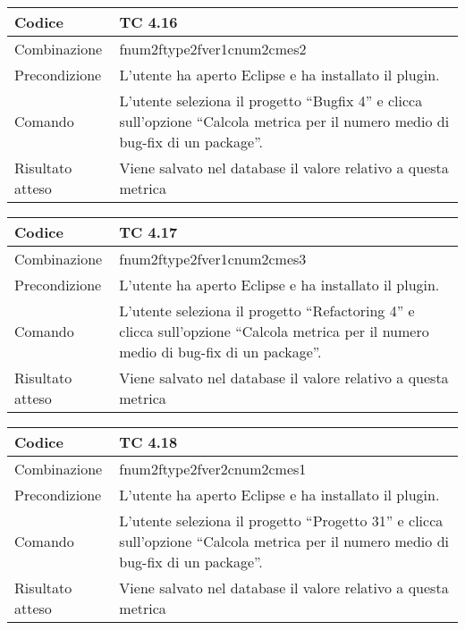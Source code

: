 \begin{table}[ht]
\begin{tabular}{|p{3cm}|p{9cm}|}
\hline
\cellcolor{lightgray}Codice				& TC 4.16								\\
\hline
\cellcolor{lightgray}Combinazione		& fnum2ftype2fver1cnum2cmes2								\\
\hline
\cellcolor{lightgray}Precondizione		& L'utente ha aperto Eclipse e ha installato il plugin.				\\
\hline
\cellcolor{lightgray}Comando			& L'utente seleziona il progetto ``Bugfix 4''  e clicca sull'opzione ``Calcola metrica per il numero medio di bug-fix di un package''.	\\
\hline
\cellcolor{lightgray}Risultato atteso	& Viene salvato nel database il valore relativo a questa metrica	\\
\hline
\end{tabular}
\end{table}

\begin{table}[ht]
\begin{tabular}{|p{3cm}|p{9cm}|}
\hline
\cellcolor{lightgray}Codice				& TC 4.17								\\
\hline
\cellcolor{lightgray}Combinazione		& fnum2ftype2fver1cnum2cmes3							\\
\hline
\cellcolor{lightgray}Precondizione		& L'utente ha aperto Eclipse e ha installato il plugin.									\\
\hline
\cellcolor{lightgray}Comando			& L'utente seleziona il progetto ``Refactoring 4''  e clicca sull'opzione ``Calcola metrica per il numero medio di bug-fix di un package''.	\\
\hline
\cellcolor{lightgray}Risultato atteso	& Viene salvato nel database il valore relativo a questa metrica	\\
\hline
\end{tabular}
\end{table}

\begin{table}[ht]
\begin{tabular}{|p{3cm}|p{9cm}|}
\hline
\cellcolor{lightgray}Codice				& TC 4.18								\\
\hline
\cellcolor{lightgray}Combinazione		& fnum2ftype2fver2cnum2cmes1 									\\
\hline
\cellcolor{lightgray}Precondizione		& L'utente ha aperto Eclipse e ha installato il plugin.				\\
\hline
\cellcolor{lightgray}Comando			& L'utente seleziona il progetto ``Progetto 31''  e clicca sull'opzione ``Calcola metrica per il numero medio di bug-fix di un package''.	\\
\hline
\cellcolor{lightgray}Risultato atteso	& Viene salvato nel database il valore relativo a questa metrica	\\
\hline
\end{tabular}
\end{table}

